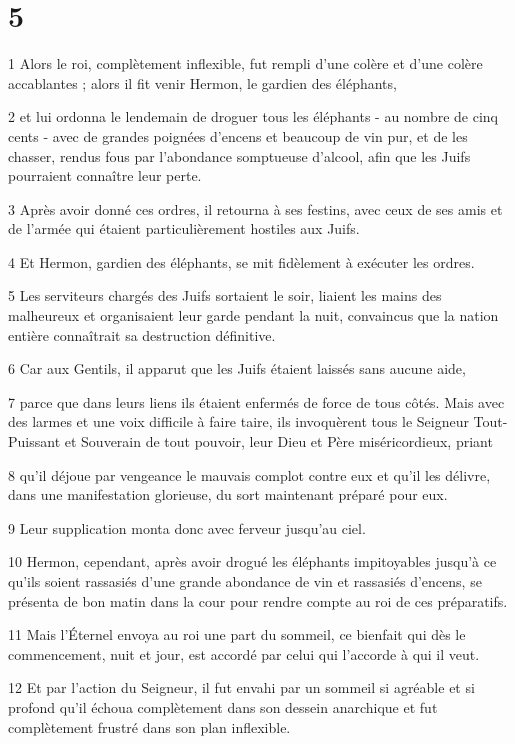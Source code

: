 \chapter{5}

\par 1 Alors le roi, complètement inflexible, fut rempli d'une colère et d'une colère accablantes ; alors il fit venir Hermon, le gardien des éléphants,
\par 2 et lui ordonna le lendemain de droguer tous les éléphants - au nombre de cinq cents - avec de grandes poignées d'encens et beaucoup de vin pur, et de les chasser, rendus fous par l'abondance somptueuse d'alcool, afin que les Juifs pourraient connaître leur perte.
\par 3 Après avoir donné ces ordres, il retourna à ses festins, avec ceux de ses amis et de l'armée qui étaient particulièrement hostiles aux Juifs.
\par 4 Et Hermon, gardien des éléphants, se mit fidèlement à exécuter les ordres.
\par 5 Les serviteurs chargés des Juifs sortaient le soir, liaient les mains des malheureux et organisaient leur garde pendant la nuit, convaincus que la nation entière connaîtrait sa destruction définitive.
\par 6 Car aux Gentils, il apparut que les Juifs étaient laissés sans aucune aide,
\par 7 parce que dans leurs liens ils étaient enfermés de force de tous côtés. Mais avec des larmes et une voix difficile à faire taire, ils invoquèrent tous le Seigneur Tout-Puissant et Souverain de tout pouvoir, leur Dieu et Père miséricordieux, priant
\par 8 qu'il déjoue par vengeance le mauvais complot contre eux et qu'il les délivre, dans une manifestation glorieuse, du sort maintenant préparé pour eux.
\par 9 Leur supplication monta donc avec ferveur jusqu'au ciel.
\par 10 Hermon, cependant, après avoir drogué les éléphants impitoyables jusqu'à ce qu'ils soient rassasiés d'une grande abondance de vin et rassasiés d'encens, se présenta de bon matin dans la cour pour rendre compte au roi de ces préparatifs.
\par 11 Mais l'Éternel envoya au roi une part du sommeil, ce bienfait qui dès le commencement, nuit et jour, est accordé par celui qui l'accorde à qui il veut.
\par 12 Et par l'action du Seigneur, il fut envahi par un sommeil si agréable et si profond qu'il échoua complètement dans son dessein anarchique et fut complètement frustré dans son plan inflexible.
